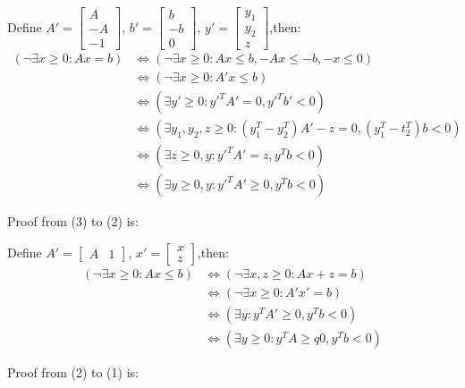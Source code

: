 \documentclass[11pt,a4paper,oneside]{article}
\newcommand{\y}{\mathbf{y}}
\newcommand{\z}{\mathbf{z}}
\begin{document}
\begin{problem}{1}
	Define $A'=\begin{bmatrix}A\\-A\\-1\end{bmatrix}$,
	$b'=\begin{bmatrix}b\\-b\\0\end{bmatrix}$,
	$y'=\begin{bmatrix}y_1\\y_2\\z\end{bmatrix}$,then:
	$$	
	\begin {align*}
	(\neg\exists x\geq 0:Ax=b)
	& \Longleftrightarrow (\neg\exists x\geq 0:Ax\leq b,-Ax\leq -b,-x\leq 0)\\
	& \Longleftrightarrow (\neg\exists x\geq 0:A'x\leq b)\\
	& \Longleftrightarrow (\exists y'\geq 0:y'^TA'=0,y'^Tb'<0)\\
	& \Longleftrightarrow (\exists y_1,y_2,z\geq 0:(y_1^T-y_2^T)A'-z=0,(y_1^T-t_2^T)b<0)\\
	& \Longleftrightarrow (\exists z\geq 0,y:y'^TA'=z,y^Tb<0)\\
	& \Longleftrightarrow (\exists y\geq 0,y:y'^TA'\geq 0,y^Tb<0)	
	\end {align*}
	$$
	
	Proof from (3) to (2) is:
	
	Define $A'=\begin{bmatrix}A & 1\end{bmatrix}$,
	$x'=\begin{bmatrix}x\\z\end{bmatrix}$,then:
	$$	
	\begin {align*}
	(\neg\exists x\geq 0:Ax\leq b)
	& \Longleftrightarrow (\neg\exists x,z\geq 0:Ax+z=b)\\
	& \Longleftrightarrow (\neg\exists x\geq 0:A'x'=b)\\
	& \Longleftrightarrow (\exists y:y^TA'\geq 0,y^Tb<0)\\
	& \Longleftrightarrow (\exists y\geq 0:y^TA\geq q0,y^Tb<0)
	\end {align*}
	$$
	
	Proof from (2) to (1) is:
	

\end{problem}
\end{document}
